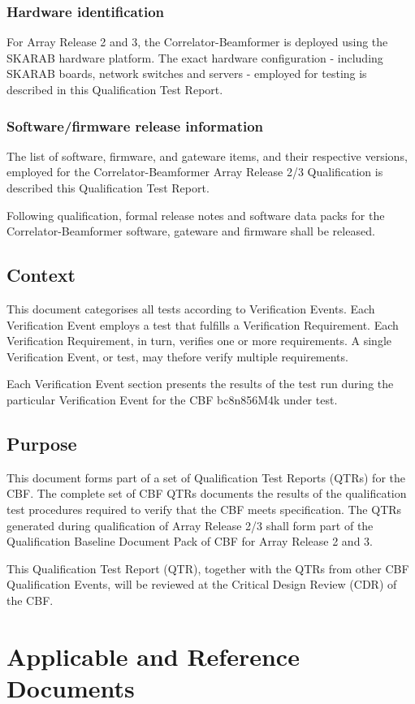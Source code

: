 \subsection{Hardware identification}
For Array Release 2 and 3, the Correlator-Beamformer is deployed using the SKARAB hardware platform. The exact hardware configuration - including SKARAB boards, network switches and servers - employed for testing is described in this Qualification Test Report.
\subsection{Software/firmware release information}
The list of software, firmware, and gateware items, and their respective versions, employed for the Correlator-Beamformer Array Release 2/3 Qualification is described this Qualification Test Report.

Following qualification, formal release notes and software data packs for the Correlator-Beamformer software, gateware and firmware shall be released.
\section{Context}
This document categorises all tests according to Verification Events. Each Verification Event employs a test that fulfills a Verification Requirement. Each Verification Requirement, in turn, verifies one or more requirements. A single Verification Event, or test, may thefore verify multiple requirements.

Each Verification Event section presents the results of the test run during the particular Verification Event for the CBF bc8n856M4k under test.
\section{Purpose}
This document forms part of a set of Qualification Test Reports (QTRs) for the CBF. The complete set of CBF QTRs documents the results of the qualification test procedures required to verify that the CBF meets specification. The QTRs generated during qualification of Array Release 2/3 shall form part of the Qualification Baseline Document Pack of CBF for Array Release 2 and 3.\newline

This Qualification Test Report (QTR), together with the QTRs from other CBF Qualification Events, will be reviewed at the Critical Design Review (CDR) of the CBF.
\chapter{Applicable and Reference Documents}
